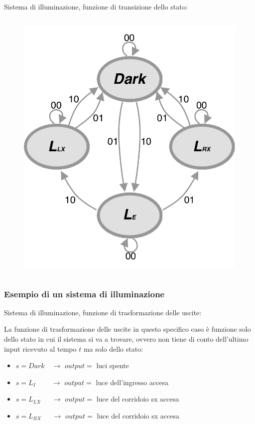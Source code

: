\begin{frame}
\begin{block}{Sistema di illuminazione, funzione di transizione dello stato:}
\begin{columns}
		\begin{figure}[!htbp]
			\centering
			\includegraphics[width=0.9\linewidth]{images/1_i_sistemi/sistemaLightF.pdf}
		\end{figure}
	\end{columns}
	\end{block}
\end{frame}



\begin{frame}
	\frametitle{Esempio di un sistema di illuminazione}
	\begin{block}{Sistema di illuminazione, funzione di trasformazione delle uscite:}
	
	La funzione di trasformazione delle uscite in questo specifico caso è funzione solo dello stato in cui il sistema si va a trovare, ovvero non tiene di conto dell'ultimo input ricevuto al tempo $t$ ma solo dello stato:
	
	\begin{itemize}
		\item $s=Dark \quad\rightarrow$ $output =$ luci spente
		\item $s=L_{I} \quad\:\quad\rightarrow$ $output =$ luce dell'ingresso accesa
		\item $s=L_{LX} \quad\;\;\rightarrow$ $output =$ luce del corridoio sx accesa
		\item $s=L_{RX} \quad\;\;\rightarrow$ $output =$ luce del corridoio sx accesa
	\end{itemize}
	
	\end{block}
\end{frame}


